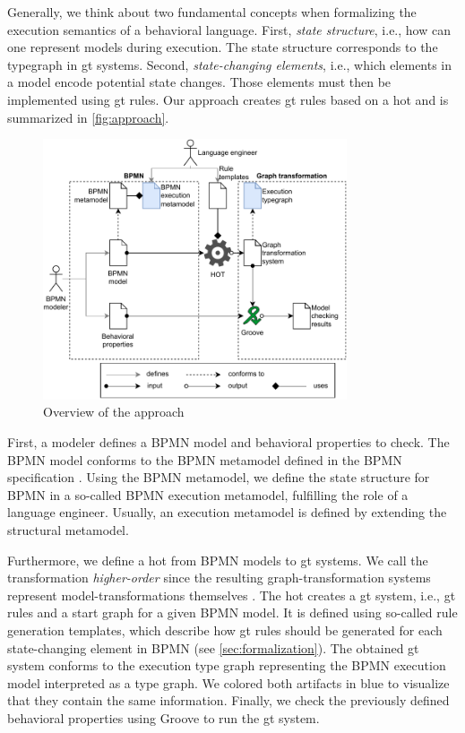 \documentclass[runningheads]{llncs}
\begin{document}
Generally, we think about two fundamental concepts when formalizing the execution semantics of a behavioral language.
First, \textit{state structure}, i.e., how can one represent models during execution.
The state structure corresponds to the typegraph in \gls*{gt} systems.
Second, \textit{state-changing elements}, i.e., which elements in a model encode potential state changes.
Those elements must then be implemented using \gls*{gt} rules.
Our approach creates \gls*{gt} rules based on a \gls*{hot} and is summarized in \autoref{fig:approach}.

\begin{figure}[ht]
    \centering
    \includegraphics[width=0.8\textwidth]{images/bpmn_semantics-overview.pdf}
    \caption{Overview of the approach}
    \label{fig:approach}
\end{figure}

First, a modeler defines a BPMN model and behavioral properties to check.
The BPMN model conforms to the BPMN metamodel defined in the BPMN specification \cite{objectmanagementgroupBusinessProcessModel2013}.
Using the BPMN metamodel, we define the state structure for BPMN in a so-called BPMN execution metamodel, fulfilling the role of a language engineer.
Usually, an execution metamodel is defined by extending the structural metamodel.

Furthermore, we define a \gls*{hot} from BPMN models to \gls*{gt} systems.
We call the transformation \textit{higher-order} since the resulting graph-transformation systems represent model-transformations themselves \cite{tisiUseHigherOrderModel2009}.
The \gls*{hot} creates a \gls*{gt} system, i.e., \gls*{gt} rules and a start graph for a given BPMN model.
It is defined using so-called rule generation templates, which describe how \gls*{gt} rules should be generated for each state-changing element in BPMN (see \autoref{sec:formalization}).
The obtained \gls*{gt} system conforms to the execution type graph representing the BPMN execution model interpreted as a type graph.
We colored both artifacts in blue to visualize that they contain the same information.
Finally, we check the previously defined behavioral properties using Groove to run the \gls*{gt} system.
\end{document}
